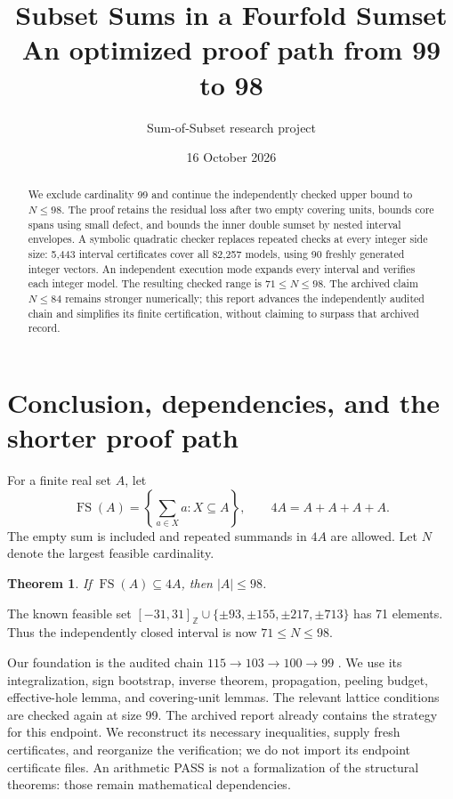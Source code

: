 \documentclass[11pt,a4paper]{article}
\title{Subset Sums in a Fourfold Sumset\\\large An optimized proof path from 99 to 98}
\author{Sum-of-Subset research project}
\date{16 October 2026}
\newcommand{\FS}{\operatorname{FS}}
\newcommand{\Z}{\mathbb Z}
\newtheorem{theorem}{Theorem}[section]
\begin{document}
\maketitle
\begin{abstract}
We exclude cardinality 99 and continue the independently checked upper
bound to $N\le98$. The proof retains the residual loss after two empty
covering units, bounds core spans using small defect, and bounds the
inner double sumset by nested interval envelopes. A symbolic quadratic
checker replaces repeated checks at every integer side size: 5,443
interval certificates cover all 82,257 models, using 90 freshly generated
integer vectors. An independent execution mode expands every interval
and verifies each integer model. The resulting checked range is
$71\le N\le98$. The archived claim $N\le84$ remains stronger numerically;
this report advances the independently audited chain and simplifies its
finite certification, without claiming to surpass that archived record.
\end{abstract}
\tableofcontents

\section{Conclusion, dependencies, and the shorter proof path}
For a finite real set $A$, let
\[
 \FS(A)=\left\{\sum_{a\in X}a:X\subseteq A\right\},
 \qquad 4A=A+A+A+A.
\]
The empty sum is included and repeated summands in $4A$ are allowed.
Let $N$ denote the largest feasible cardinality.
\begin{theorem}\label{thm:main}
If $\FS(A)\subseteq4A$, then $|A|\le98$.
\end{theorem}
The known feasible set
$[-31,31]_{\Z}\cup\{\pm93,\pm155,\pm217,\pm713\}$ has 71 elements.
Thus the independently closed interval is now $71\le N\le98$.

Our foundation is the audited chain
$115\to103\to100\to99$ \cite{base103,base100,base99}.
We use its integralization, sign bootstrap, inverse theorem, propagation,
peeling budget, effective-hole lemma, and covering-unit lemmas.
The relevant lattice conditions are checked again at size 99.
The archived report \cite{archive} already contains the strategy for
this endpoint. We reconstruct its necessary inequalities, supply fresh
certificates, and reorganize the verification; we do not import its
endpoint certificate files. An arithmetic PASS is not a formalization
of the structural theorems: those remain mathematical dependencies.
\end{document}
